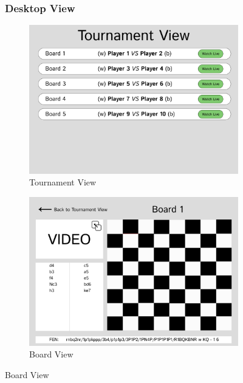 \begin{figure}[h!]
\subsubsection*{Desktop View}
    \centering
    \begin{subfigure}[h!]{0.40\linewidth}
        \centering
        \includegraphics[width=\linewidth]{figures/methods/wireframes/desktop-tournament-view.png}
        \caption{Tournament View}
        \label{fig:desktoop-tournament-view}
    \end{subfigure}
    \hfill
    \begin{subfigure}[h!]{0.40\linewidth}
        \centering
        \includegraphics[width=\linewidth]{figures/methods/wireframes/desktop-board-view.png}
        \caption{Board View}
        \label{fig:desktop-board-view}
    \end{subfigure}


\end{figure}
